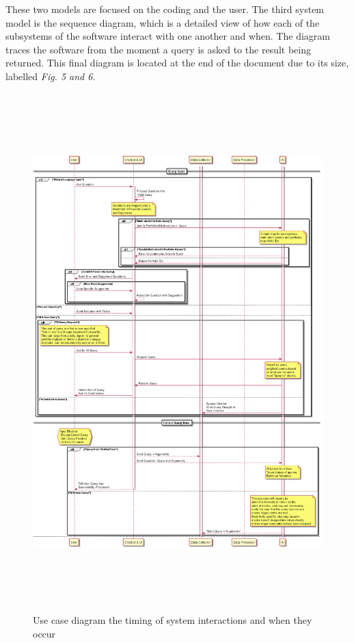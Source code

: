 \documentclass[]{IEEEtran}
\begin{document}
	These two models are focused on the coding and the user. The third system model is the sequence diagram, which is a detailed view of how each of the subsystems of the software interact with one another and when. The diagram traces the software from the moment a query is asked to the result being returned. This final diagram is located at the end of the document due to its size, labelled \textit{Fig. 5 and 6}.
	
	\begin{figure}[h]
		\includegraphics[width=\textwidth, height = 20cm]{sequence}
		\caption{Use case diagram the timing of system interactions and when they occur}
	\end{figure}
	
\end{document}
